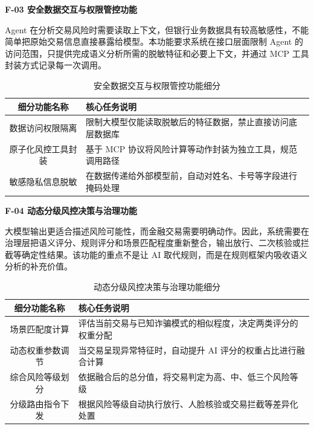 \documentclass{xduugthesis}
\begin{document}
\textbf{F-03 安全数据交互与权限管控功能}

Agent 在分析交易风险时需要读取上下文，但银行业务数据具有较高敏感性，不能简单把原始交易信息直接暴露给模型。本功能要求系统在接口层面限制 Agent 的访问范围，只提供完成语义分析所需的脱敏特征和必要上下文，并通过 MCP 工具封装方式记录每一次调用。

\begin{table}[H]
    \centering
    \caption{安全数据交互与权限管控功能细分}
    \label{tab:f03-sub}
    \begin{tabularx}{\linewidth}{|c|Y|}
        \hline
        细分功能名称 & 核心任务说明 \\
        \hline
        数据访问权限隔离 & 限制大模型仅能读取脱敏后的特征数据，禁止直接访问底层数据库 \\
        \hline
        原子化风控工具封装 & 基于 MCP 协议将风险计算等动作封装为独立工具，规范调用路径 \\
        \hline
        敏感隐私信息脱敏 & 在数据传递给外部模型前，自动对姓名、卡号等字段进行掩码处理 \\
        \hline
    \end{tabularx}
\end{table}

\textbf{F-04 动态分级风控决策与治理功能}

大模型输出更适合描述风险可能性，而金融交易需要明确动作。因此，系统需要在治理层把语义评分、规则评分和场景匹配程度重新整合，输出放行、二次核验或拦截等确定性结果。该功能的重点不是让 AI 取代规则，而是在规则框架内吸收语义分析的补充价值。

\begin{table}[H]
    \centering
    \caption{动态分级风控决策与治理功能细分}
    \label{tab:f04-sub}
    \begin{tabularx}{\linewidth}{|c|Y|}
        \hline
        细分功能名称 & 核心任务说明 \\
        \hline
        场景匹配度计算 & 评估当前交易与已知诈骗模式的相似程度，决定两类评分的权重分配 \\
        \hline
        动态权重参数调节 & 当交易呈现异常特征时，自动提升 AI 评分的权重占比进行融合计算 \\
        \hline
        综合风险等级划分 & 依据融合后的总分值，将交易判定为高、中、低三个风险等级 \\
        \hline
        分级路由指令下发 & 根据风险等级自动执行放行、人脸核验或交易拦截等差异化处置 \\
        \hline
    \end{tabularx}
\end{table}
\end{document}
